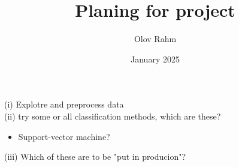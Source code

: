\documentclass{article}
\title{Planing for project}
\author{Olov Rahm}
\date{January 2025}
\begin{document}
\maketitle

\noindent
(i) Explotre and preprocess data
\\
(ii) try some or all classification methods, which are these?
\begin{itemize}
    \item Support-vector machine?
\end{itemize}
(iii) Which of these are to be "put in producion"?
\end{document}
